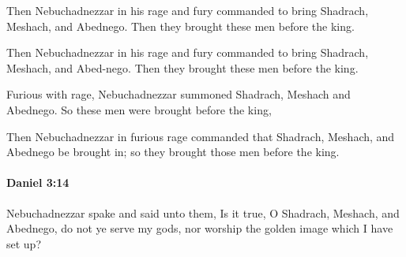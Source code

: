 			Then Nebuchadnezzar in his rage and fury commanded to bring Shadrach, Meshach, and Abednego. Then they brought these men before the king.

			\begin{versebox}
					\item[BHS] 
					\item[LXX] 
					\item[ASV] Then Nebuchadnezzar in his rage and fury commanded to bring Shadrach, Meshach, and Abed-nego. Then they brought these men before the king.
					\item[NIV] Furious with rage, Nebuchadnezzar summoned Shadrach, Meshach and Abednego. So these men were brought before the king,
					\item[NRSV] Then Nebuchadnezzar in furious rage commanded that Shadrach, Meshach, and Abednego be brought in; so they brought those men before the king.
			\end{versebox}

		\paragraph{Daniel 3:14} %
			\label{DANIEL-3-14}

			Nebuchadnezzar spake and said unto them, Is it true, O Shadrach, Meshach, and Abednego, do not ye serve my gods, nor worship the golden image which I have set up?

